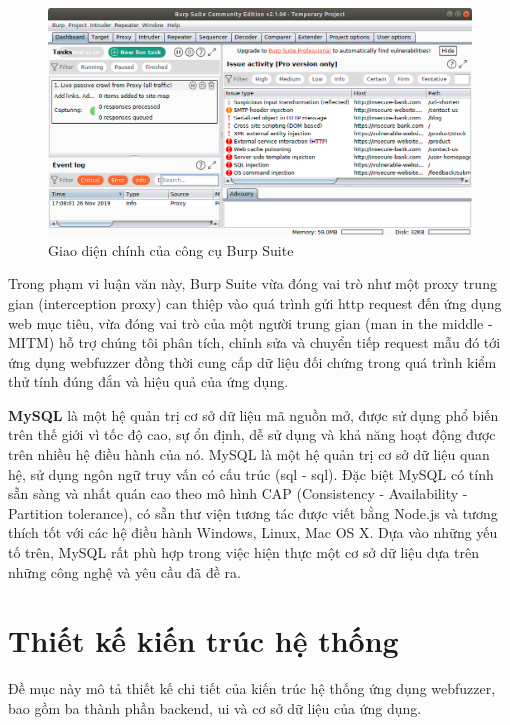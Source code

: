 \begin{figure}[H]
    \centering
        \includegraphics[width=\textwidth,keepaspectratio=true]{images/burp-suite-usage.png}
    \caption{Giao diện chính của công cụ Burp Suite}
    \label{fig:burp-suite-usage}
\end{figure}
Trong phạm vi luận văn này, Burp Suite vừa đóng vai trò như một proxy trung gian (interception proxy) can thiệp vào quá trình gửi \acrshort{http} request đến ứng dụng web mục tiêu, vừa đóng vai trò của một người trung gian (man in the middle - MITM) hỗ trợ chúng tôi phân tích, chỉnh sửa và chuyển tiếp request mẫu đó tới ứng dụng webfuzzer đồng thời cung cấp dữ liệu đối chứng trong quá trình kiểm thử tính đúng đắn và hiệu quả của ứng dụng.\par
\textbf{MySQL} là một hệ quản trị cơ sở dữ liệu mã nguồn mở, được sử dụng phổ biến trên thế giới vì tốc độ cao, sự ổn định, dễ sử dụng và khả năng hoạt động được trên nhiều hệ điều hành của nó. MySQL là một hệ quản trị cơ sở dữ liệu quan hệ, sử dụng ngôn ngữ truy vấn có cấu trúc (\acrlong{sql} - \acrshort{sql}). Đặc biệt MySQL có tính sẵn sàng và nhất quán cao theo mô hình CAP (Consistency - Availability - Partition tolerance), có sẵn thư viện tương tác được viết bằng Node.js và tương thích tốt với các hệ điều hành Windows, Linux, Mac OS X. Dựa vào những yếu tố trên, MySQL rất phù hợp trong việc hiện thực một cơ sở dữ liệu dựa trên những công nghệ và yêu cầu đã đề ra.
\section{Thiết kế kiến trúc hệ thống}
Đề mục này mô tả thiết kế chi tiết của kiến trúc hệ thống ứng dụng webfuzzer, bao gồm ba thành phần backend, \acrshort{ui} và cơ sở dữ liệu của ứng dụng.
